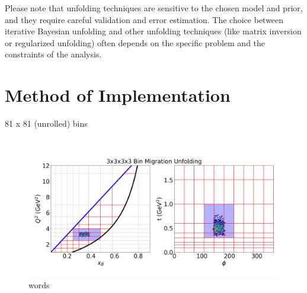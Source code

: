     Please note that unfolding techniques are sensitive to the chosen model and prior, and they require careful validation and error estimation. The choice between iterative Bayesian unfolding and other unfolding techniques (like matrix inversion or regularized unfolding) often depends on the specific problem and the constraints of the analysis.

\section{Method of Implementation}
    81 x 81 (unrolled) bins
    
        \begin{figure}[ht]
        \centering
        \includegraphics[trim={0 0 0 0},clip,width=\textwidth]{Chapters/Ch5-Further/0_IBU/pics/kerneling/bin_migration_1_1_1_1.png}
        \caption[words]{words}
        \label{fig:ibu1}
        \end{figure}
    

